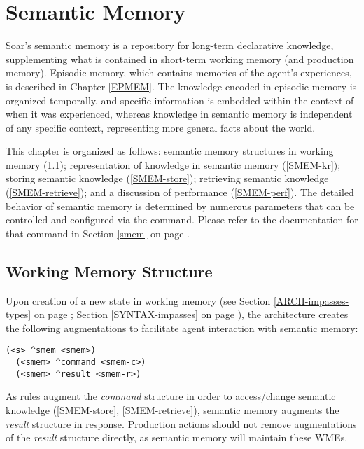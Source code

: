\chapter{Semantic Memory}
\label{SMEM}

Soar's semantic memory is a repository for long-term declarative knowledge, supplementing what is contained in short-term working memory (and production memory). 
Episodic memory, which contains memories of the agent's experiences, is described in Chapter \ref{EPMEM}. 
The knowledge encoded in episodic memory is organized temporally, and specific information is embedded within the context of when it was experienced, whereas knowledge in semantic memory is independent of any specific context, representing more general facts about the world.

This chapter is organized as follows: semantic memory structures in working memory (\ref{SMEM-wm}); representation of knowledge in semantic memory (\ref{SMEM-kr}); storing semantic knowledge (\ref{SMEM-store}); retrieving semantic knowledge (\ref{SMEM-retrieve}); and a discussion of performance (\ref{SMEM-perf}). 
The detailed behavior of semantic memory is determined by numerous parameters that can be controlled and configured via the  command. 
Please refer to the documentation for that command in Section \ref{smem} on page \pageref{smem}.


\section{Working Memory Structure}
\label{SMEM-wm}

Upon creation of a new state in working memory (see Section \ref{ARCH-impasses-types} on page \pageref{ARCH-impasses-types}; Section \ref{SYNTAX-impasses} on page \pageref{SYNTAX-impasses}), the architecture creates the following augmentations to facilitate agent interaction with semantic memory:

\begin{verbatim}
(<s> ^smem <smem>)
  (<smem> ^command <smem-c>)
  (<smem> ^result <smem-r>)
\end{verbatim}

As rules augment the \emph{command} structure in order to access/change semantic knowledge (\ref{SMEM-store}, \ref{SMEM-retrieve}), semantic memory augments the \emph{result} structure in response.
Production actions should not remove augmentations of the \emph{result} structure directly, as semantic memory will maintain these WMEs.



